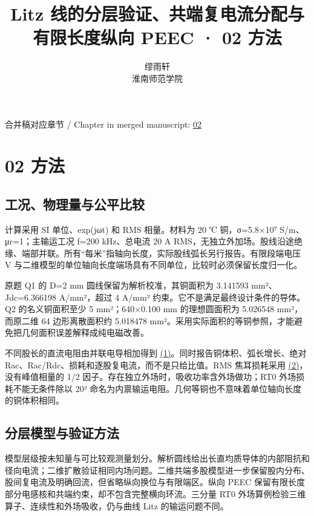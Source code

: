 \documentclass[11pt]{article}
\begin{document}
\title{Litz 线的分层验证、共端复电流分配与有限长度纵向 PEEC · 02 方法}
\author{缪雨轩\\淮南师范学院}
\date{}
\maketitle
\noindent 合并稿对应章节 / Chapter in merged manuscript: \href{paper_zh-CN_single.pdf#chapter-02}{02}\par
\FloatBarrier
\section*{02 方法}
\hypertarget{chapter-02}{}
\subsection*{工况、物理量与公平比较}
\hypertarget{02.conventions.heading}{}
计算采用 SI 单位、exp(jωt) 和 RMS 相量。材料为 20 ℃ 铜，σ=5.8×10⁷ S/m、μr=1；主输运工况 f=200 kHz、总电流 20 A RMS，无独立外加场。股线沿途绝缘、端部并联。所有“每米”指轴向长度，实际股线弧长另行报告。有限段端电压 V 与二维模型的单位轴向长度端场具有不同单位，比较时必须保留长度归一化。


原题 Q1 的 D=2 mm 圆线保留为解析校准，其铜面积为 3.141593 mm²、Jdc=6.366198 A/mm²，超过 4 A/mm² 约束。它不是满足最终设计条件的导体。Q2 的名义铜面积至少 5 mm²；640×0.100 mm 的理想圆面积为 5.026548 mm²，而原二维 64 边形离散面积约 5.018478 mm²。采用实际面积的等铜参照，才能避免把几何面积误差解释成纯电磁改善。


不同股长的直流电阻由并联电导相加得到 \href{paper_zh-CN_single.pdf#E01}{(1)}。同时报告铜体积、弧长增长、绝对 Rac、Rac/Rdc、损耗和逐股复电流，而不是只给比值。RMS 焦耳损耗采用 \href{paper_zh-CN_single.pdf#E02}{(2)}，没有峰值相量的 1/2 因子。存在独立外场时，吸收功率含外场做功；RT0 外场损耗不能无条件除以 20² 命名为内禀输运电阻。几何等铜也不意味着单位轴向长度的铜体积相同。


\subsection*{分层模型与验证方法}
\hypertarget{02.hierarchy.heading}{}
模型层级按未知量与可比较观测量划分。解析圆线给出长直均质导体的内部阻抗和径向电流；二维扩散验证相同内场问题。二维共端多股模型进一步保留股内分布、股间复电流及明确回流，但省略纵向换位与有限端区。纵向 PEEC 保留有限长度部分电感核和共端约束，却不包含完整横向环流。三分量 RT0 外场算例检验三维算子、连续性和外场吸收，仍与曲线 Litz 的输运问题不同。
\end{document}
